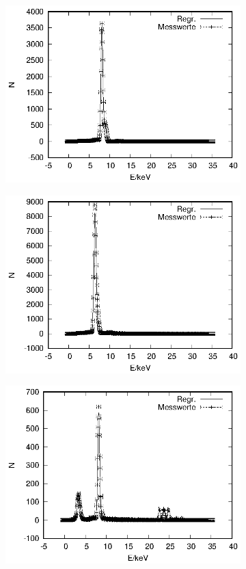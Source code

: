 \begin{figure}[!h]
\begin{subfigure}[h]{0.5\textwidth}
    \includegraphics{data/Massenanteil/cu.eps}
  \end{subfigure}%
  \begin{subfigure}[h]{0.5\textwidth}
    \centering
    \includegraphics{data/Massenanteil/fe.eps}
  \end{subfigure}
  \begin{subfigure}[h]{0.5\textwidth}
    \centering
    \includegraphics{data/Massenanteil/in.eps}

\end{subfigure}
\end{figure}
